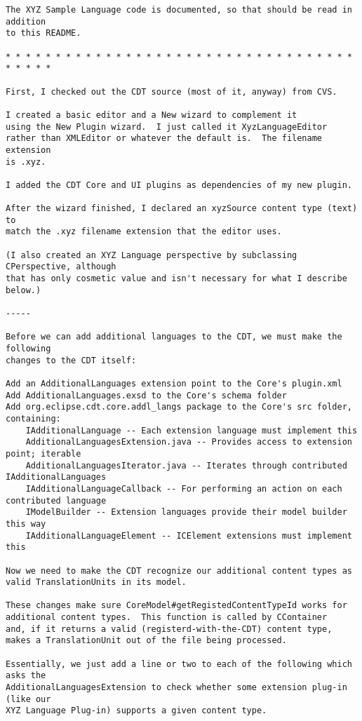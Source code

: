 \begin{verbatim}
The XYZ Sample Language code is documented, so that should be read in addition
to this README.

* * * * * * * * * * * * * * * * * * * * * * * * * * * * * * * * * * * * * * * *

First, I checked out the CDT source (most of it, anyway) from CVS.

I created a basic editor and a New wizard to complement it
using the New Plugin wizard.  I just called it XyzLanguageEditor
rather than XMLEditor or whatever the default is.  The filename extension
is .xyz.

I added the CDT Core and UI plugins as dependencies of my new plugin.

After the wizard finished, I declared an xyzSource content type (text) to
match the .xyz filename extension that the editor uses.

(I also created an XYZ Language perspective by subclassing CPerspective, although
that has only cosmetic value and isn't necessary for what I describe below.)

-----

Before we can add additional languages to the CDT, we must make the following
changes to the CDT itself:

Add an AdditionalLanguages extension point to the Core's plugin.xml
Add AdditionalLanguages.exsd to the Core's schema folder
Add org.eclipse.cdt.core.addl_langs package to the Core's src folder, containing:
	IAdditionalLanguage -- Each extension language must implement this
	AdditionalLanguagesExtension.java -- Provides access to extension point; iterable
	AdditionalLanguagesIterator.java -- Iterates through contributed IAdditionalLanguages
	IAdditionalLanguageCallback -- For performing an action on each contributed language
	IModelBuilder -- Extension languages provide their model builder this way
	IAdditionalLanguageElement -- ICElement extensions must implement this

Now we need to make the CDT recognize our additional content types as 
valid TranslationUnits in its model.

These changes make sure CoreModel#getRegistedContentTypeId works for
additional content types.  This function is called by CContainer
and, if it returns a valid (registerd-with-the-CDT) content type,
makes a TranslationUnit out of the file being processed.

Essentially, we just add a line or two to each of the following which asks the
AdditionalLanguagesExtension to check whether some extension plug-in (like our
XYZ Language Plug-in) supports a given content type.


\end{verbatim}
